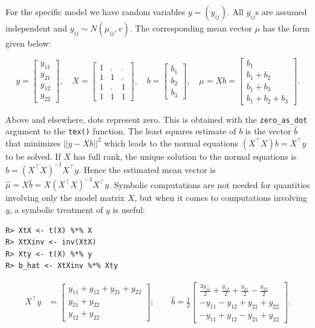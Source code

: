 For the specific model we have random variables \(y=(y_{ij})\). All
\(y_{ij}\)s are assumed independent and \(y_{ij}\sim N(\mu_{ij}, v)\).
The corresponding mean vector \(\mu\) has the form given below:

\[
y = \left[\begin{matrix}y_{11}\\y_{21}\\y_{12}\\y_{22}\end{matrix}\right], \quad X=\left[\begin{matrix}1 & . & .\\1 & 1 & .\\1 & . & 1\\1 & 1 & 1\end{matrix}\right], \quad b=\left[\begin{matrix}b_{1}\\b_{2}\\b_{3}\end{matrix}\right], \quad  \mu = X b = \left[\begin{matrix}b_{1}\\b_{1} + b_{2}\\b_{1} + b_{3}\\b_{1} + b_{2} + b_{3}\end{matrix}\right] .
\]

Above and elsewhere, dots represent zero. This is obtained with the \texttt{zero\_as\_dot} argument to the \texttt{tex()} function.
The least squares estimate of \(b\) is the vector \(\hat{b}\) that minimizes \(||y-X b||^2\) which leads to the normal equations \((X^\top X)b = X^\top y\) to be solved. If \(X\) has full rank, the unique solution to the normal
equations is \(\hat{b} = (X^\top X)^{-1} X^\top y\). Hence the
estimated mean vector is \(\hat \mu = X\hat{b}=X(X^\top X)^{-1} X^\top y\). Symbolic computations are
not needed for quantities involving only the model matrix \(X\), but
when it comes to computations involving \(y\), a symbolic treatment of
\(y\) is useful:

\begin{verbatim}
R> XtX <- t(X) %*% X
R> XtXinv <- inv(XtX)
R> Xty <- t(X) %*% y
R> b_hat <- XtXinv %*% Xty
\end{verbatim}

\begin{align}
X^\top y &= \left[\begin{matrix}y_{11} + y_{12} + y_{21} + y_{22}\\y_{21} + y_{22}\\y_{12} + y_{22}\end{matrix}\right]; \quad 
\quad
\hat{b} = \frac{1}{2}  \left[\begin{matrix}\frac{3 y_{11}}{2} + \frac{y_{12}}{2} + \frac{y_{21}}{2} - \frac{y_{22}}{2}\\- y_{11} - y_{12} + y_{21} + y_{22}\\- y_{11} + y_{12} - y_{21} + y_{22}\end{matrix}\right].
\end{align}

